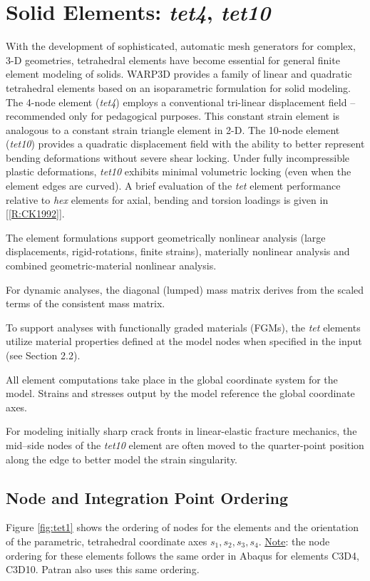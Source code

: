 \documentclass[11pt]{report}
\numberwithin{equation}{section}
\newcommand{\ul} {\underline}
\newcommand{\ti}{\emph}
\newcommand{\tfour}{\ti{tet4}\xspace}
\newcommand{\tten}{\ti{tet10}\xspace}
\begin{document}
\section{Solid Elements:\textit{ tet4}, \textit{tet10}}

With the development of sophisticated, automatic mesh generators for complex, 3-D
geometries, tetrahedral elements have become essential for general finite
element modeling of solids. WARP3D provides a family of linear and quadratic
tetrahedral elements based on an isoparametric formulation for solid modeling.
The 4-node element (\tfour) employs a conventional tri-linear displacement field -- 
recommended only for pedagogical purposes.
This constant strain element is analogous to a constant strain triangle element
in 2-D. The 10-node element (\tten) provides a quadratic displacement field with
the ability to better represent bending deformations without severe shear
locking. Under fully incompressible plastic deformations, \tten exhibits minimal
volumetric locking (even when the element edges are curved). A brief
evaluation of the \ti{tet} element performance relative to \ti{hex}
elements for axial, bending and torsion loadings is given in [\ref{R:CK1992}].

The element formulations support geometrically nonlinear analysis (large
displacements, rigid-rotations, finite strains), materially nonlinear analysis and
combined geometric-material nonlinear analysis. 

For dynamic analyses, the diagonal (lumped) mass matrix derives from the scaled
terms of the consistent mass matrix.

To support analyses with functionally graded materials (FGMs), the \ti{tet} elements
utilize material properties defined at the model nodes when specified in the
input (see Section 2.2).

All element computations take place in the global coordinate system for the
model. Strains and stresses output by the model reference the global coordinate
axes.

For modeling initially sharp crack fronts in linear-elastic fracture
 mechanics, the mid--side nodes of the \tten element are often
 moved to the quarter-point position along the edge to better model the strain singularity.
\subsection {Node and Integration Point Ordering} 
Figure \ref{fig:tet1}  shows the ordering of nodes for the elements and the orientation of the
parametric, tetrahedral coordinate axes $s_1, s_2, s_3, s_4$. \ul{Note}: the node ordering for these
elements follows the same order in Abaqus for elements C3D4, C3D10. Patran also
uses this same ordering.
\end{document}
